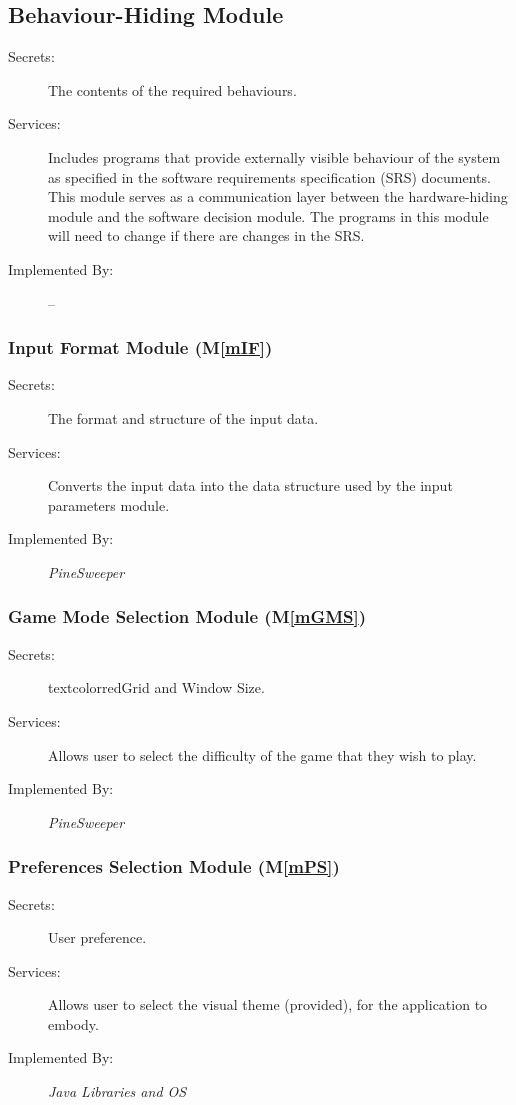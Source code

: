 \documentclass[12pt, titlepage]{article}
\newcommand{\mref}[1]{M\ref{#1}}
\begin{document}
\subsection{Behaviour-Hiding Module}
\begin{description}
\item[Secrets:]The contents of the required behaviours.
\item[Services:]Includes programs that provide externally visible behaviour of
  the system as specified in the software requirements specification (SRS)
  documents. This module serves as a communication layer between the
  hardware-hiding module and the software decision module. The programs in this
  module will need to change if there are changes in the SRS.
\item[Implemented By:] --
\end{description}

\subsubsection{Input Format Module (\mref{mIF})}
\begin{description}
\item[Secrets:]The format and structure of the input data.
\item[Services:]Converts the input data into the data structure used by the
  input parameters module.
\item[Implemented By:] \textit{PineSweeper}\\
\end{description}

\subsubsection{Game Mode Selection Module (\mref{mGMS})}
\begin{description}
\item[Secrets:] textcolor{red}{Grid and Window Size.}
\item[Services:] Allows user to select the difficulty of the game that they
  wish to play.
\item[Implemented By:] \textit{PineSweeper}\\
\end{description}

\subsubsection{Preferences Selection Module (\mref{mPS})}
\begin{description}
\item[Secrets:] User preference.
\item[Services:] Allows user to select the visual theme (provided),
   for the application to embody.
\item[Implemented By:] \textit{Java Libraries and OS}\\
\end{description}
\end{document}
